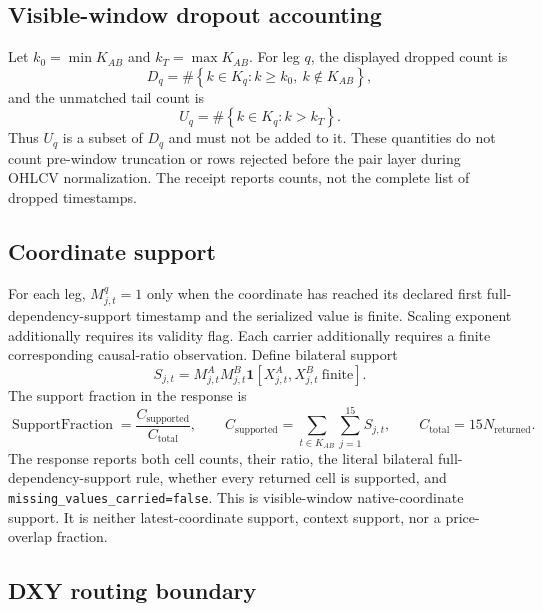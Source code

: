 \documentclass{article}
\begin{document}
\subsection{Visible-window dropout accounting}

Let $k_0=\min K_{AB}$ and $k_T=\max K_{AB}$. For leg $q$, the displayed dropped count is
\begin{equation}
D_q=\#\left\{k\in K_q:k\ge k_0,\ k\notin K_{AB}\right\},
\label{eq:dropped}
\end{equation}
and the unmatched tail count is
\begin{equation}
U_q=\#\left\{k\in K_q:k>k_T\right\}.
\label{eq:tail}
\end{equation}
Thus $U_q$ is a subset of $D_q$ and must not be added to it. These quantities do not count pre-window truncation or rows rejected before the pair layer during OHLCV normalization. The receipt reports counts, not the complete list of dropped timestamps.

\subsection{Coordinate support}

For each leg, $M^q_{j,t}=1$ only when the coordinate has reached its declared first full-dependency-support timestamp and the serialized value is finite. Scaling exponent additionally requires its validity flag. Each carrier additionally requires a finite corresponding causal-ratio observation. Define bilateral support
\begin{equation}
S_{j,t}=
M^A_{j,t}M^B_{j,t}
\mathbf 1\!\left[X^A_{j,t},X^B_{j,t}\ \text{finite}\right].
\label{eq:support}
\end{equation}
The support fraction in the response is
\begin{equation}
\operatorname{SupportFraction}
=\frac{C_{\mathrm{supported}}}{C_{\mathrm{total}}},
\qquad
C_{\mathrm{supported}}
=\sum_{t\in K_{AB}}\sum_{j=1}^{15}S_{j,t},
\qquad
C_{\mathrm{total}}=15N_{\mathrm{returned}}.
\label{eq:support-fraction}
\end{equation}
The response reports both cell counts, their ratio, the literal bilateral
full-dependency-support rule, whether every returned cell is supported, and
\texttt{missing\_values\_carried=false}. This is visible-window
native-coordinate support. It is neither latest-coordinate support, context
support, nor a price-overlap fraction.

\subsection{DXY routing boundary}
\end{document}
